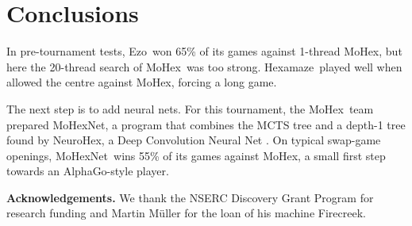 \documentclass{icga}
\def\Eo{\mbox{\sc Ezo}}
\def\Hz{\mbox{\sc Hexamaze}}
\def\Mx{\mbox{\sc MoHex}}
\def\Mt{\mbox{\sc MoHexNet}}
\def\Nx{\mbox{\sc NeuroHex}}
\begin{document}
\section{Conclusions}
In pre-tournament tests,
\Eo\ won 65\% of its games against 1-thread \Mx,
but here the 20-thread search of \Mx\ was too strong.
\Hz\ played well when allowed the centre against \Mx,
forcing a long game.

The next step is to add neural nets.
For this tournament,
the \Mx\ team prepared \Mt{}, a program that combines the
MCTS tree and a depth-1 tree found by \Nx{}, 
a Deep Convolution Neural Net .
On typical swap-game openings,
\Mt\ wins 55\% of its games against \Mx,
a small first step towards an AlphaGo-style player.

{\bf Acknowledgements.}
We thank the NSERC Discovery Grant Program for research funding and
Martin M\"{u}ller for the loan of his machine Firecreek.

\end{document}
